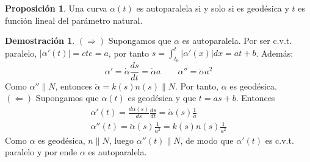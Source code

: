 \documentclass[twoside]{report}
\theoremstyle{definition}
\newtheorem{prop}[theorem]{Proposición}
\newtheorem*{dem}{Demostración}
\numberwithin{equation}{section}
\begin{document}
\begin{prop}
Una curva $\alpha(t)$ es autoparalela si y solo si es geodésica y $t$ es función lineal del parámetro natural.
\end{prop}
\begin{dem}
$(\Rightarrow)$ Supongamos que $\alpha$ es autoparalela. Por ser c.v.t. paralelo,  $|\alpha'(t)| = cte = a$, por tanto $s=\int_{t_0}^t|\alpha'(x)|dx = at+b$. Además:
\[
\alpha' = \dot{\alpha} \frac{ds}{dt} =\dot{\alpha}a \qquad
 \alpha''  = \ddot{\alpha}a^2
 \]
Como $\alpha'' \parallel N$, entonces $\ddot{\alpha}=k(s)n(s)\parallel N$. Por tanto, $\alpha$ es geodésica.\\
$(\Leftarrow)$ Supongamos que $\alpha(t)$ es geodésica y que $t=as+b$. Entonces
\begin{gather*}
\alpha'(t)=\frac{d\alpha(s)}{ds}\frac{ds}{dt}=\dot{\alpha}(s)\frac{1}{a}\\
\alpha''(t)=\ddot{\alpha}(s)\frac{1}{a^2}=k(s)n(s)\frac{1}{a^2}
\end{gather*}
Como $\alpha$ es geodésica, $n\parallel N$, luego $\alpha''(t)\parallel N$, de modo que $\alpha'(t)$ es c.v.t. paralelo y por ende $\alpha$ es autoparalela.
\end{dem}
\end{document}
